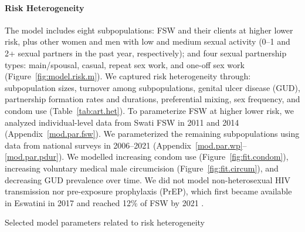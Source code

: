 \paragraph{Risk Heterogeneity}
The model includes eight subpopulations:
FSW and their clients at higher \vs lower risk,
plus other women and men with low and medium sexual activity
(0--1 and 2+ sexual partners in the past year, respectively);
and four sexual partnership types:
main/spousal, casual, repeat sex work, and one-off sex work
(Figure~\ref{fig:model.risk.m}).
We captured risk heterogeneity through:
subpopulation sizes, turnover among subpopulations, genital ulcer disease (GUD),
partnership formation rates and durations, preferential mixing, sex frequency, and condom use
(Table~\ref{tab:art.het}).
To parameterize FSW at higher \vs lower risk, we analyzed individual-level data
from Swati FSW in 2011 \cite{Baral2014} and 2014 \cite{EswKP2014}
(Appendix~\ref{mod.par.fsw}).
We parameterized the remaining subpopulations using data from
national surveys in 2006--2021 \cite{SDHS2006,SHIMS1,SHIMS2,SHIMS3}
(Appendix~\ref{mod.par.wp}--\ref{mod.par.pdur}).
We modelled
increasing condom use (Figure~\ref{fig:fit.condom}),
increasing voluntary medical male circumcision (Figure~\ref{fig:fit.circum}), and
decreasing GUD prevalence over time.
We did not model non-heterosexual HIV transmission
nor pre-exposure prophylaxis (PrEP),
which first became available in Eswatini in 2017
and reached 12\% of FSW by 2021 \cite{EswIBBS2022}.
\begin{table}
  \centering
  \caption{Selected model parameters related to risk heterogeneity}
  
  \label{tab:art.het}
\end{table}
